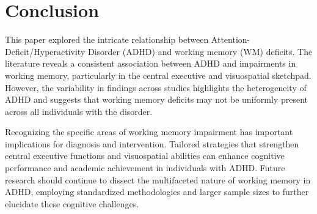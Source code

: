 \documentclass[stu]{apa7}
\begin{document}
\section{Conclusion}

This paper explored the intricate relationship between Attention-Deficit/Hyperactivity Disorder (ADHD) and working memory (WM) deficits. The literature reveals a consistent association between ADHD and impairments in working memory, particularly in the central executive and visuospatial sketchpad. However, the variability in findings across studies highlights the heterogeneity of ADHD and suggests that working memory deficits may not be uniformly present across all individuals with the disorder.

Recognizing the specific areas of working memory impairment has important implications for diagnosis and intervention. Tailored strategies that strengthen central executive functions and visuospatial abilities can enhance cognitive performance and academic achievement in individuals with ADHD. Future research should continue to dissect the multifaceted nature of working memory in ADHD, employing standardized methodologies and larger sample sizes to further elucidate these cognitive challenges.

\printbibliography
\end{document}
